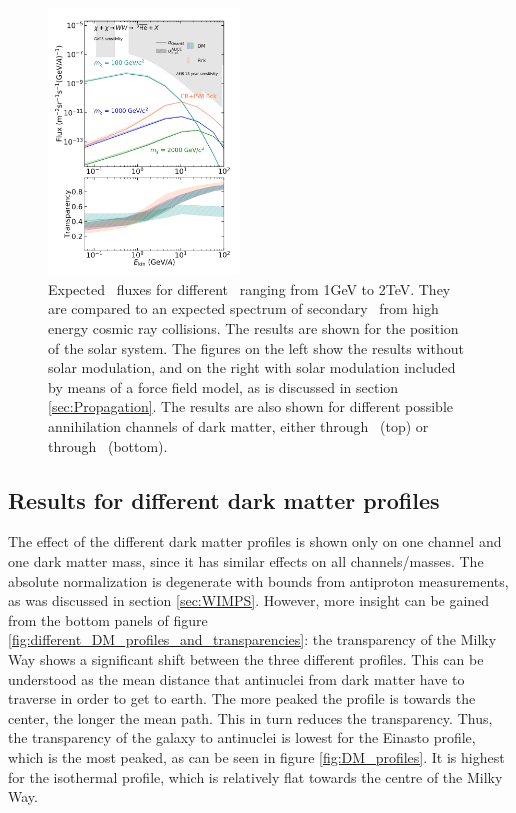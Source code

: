 \begin{figure}[hbtp]
    \includegraphics[width=0.45\textwidth]{figures/he3bar_WW_SM.png}
    \caption{Expected \ahe\ fluxes for different \dmm\ ranging from 1GeV to 2TeV. They are compared to an expected spectrum of secondary \ahe\ from high energy cosmic ray collisions. The results are shown for the position of the solar system. The figures on the left show the results without solar modulation, and on the right with solar modulation included by means of a force field model, as is discussed in section \ref{sec:Propagation}. The results are also shown for different possible annihilation channels of dark matter, either through \WW\ (top) or through \bb\ (bottom).}
    \label{fig:Results_He3_fluxes_diff_DM_masses}
\end{figure}

\subsection{Results for different dark matter profiles}\label{sec:ResDMProfiles}
The effect of the different dark matter profiles is shown only on one channel and one dark matter mass, since it has similar effects on all channels/masses. The absolute normalization is degenerate with bounds from antiproton measurements, as was discussed in section \ref{sec:WIMPS}. However, more insight can be gained from the bottom panels of figure \ref{fig:different_DM_profiles_and_transparencies}: the transparency of the Milky Way shows a significant shift between the three different profiles. This can be understood as the mean distance that antinuclei from dark matter have to traverse in order to get to earth. The more peaked the profile is towards the center, the longer the mean path. This in turn reduces the transparency. Thus, the transparency of the galaxy to antinuclei is lowest for the Einasto profile, which is the most peaked, as can be seen in figure \ref{fig:DM_profiles}. It is highest for the isothermal profile, which is relatively flat towards the centre of the Milky Way. 

